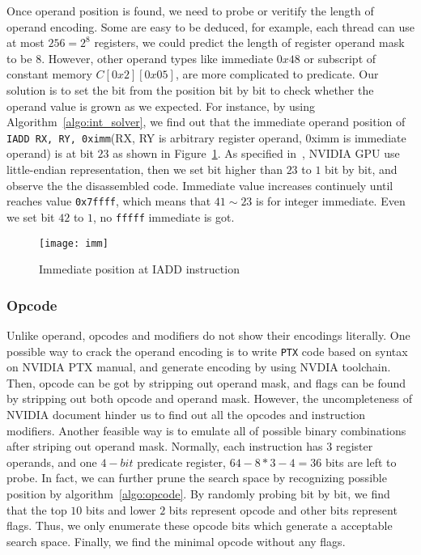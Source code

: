 Once operand position is found, we need to probe or veritify the length of operand encoding. Some are easy to be
deduced, for example, each thread can use at most $256=2^{8}$ registers, we could predict the length of register operand mask to be $8$.
However, other operand types like immediate $0x48$ or subscript of constant memory $C[0x2][0x05]$, are more complicated to predicate. Our solution is to set the bit from the position bit by bit to check whether the operand value is grown as we expected. For instance, by using Algorithm~\ref{algo:int_solver}, we find out that the immediate operand position of {\tt IADD RX, RY, 0ximm}(RX, RY is arbitrary register operand, 0ximm is immediate operand) is at bit $23$ as shown in Figure~\ref{fig:imm}. As specified in~\cite{cuda2015programming}, NVIDIA GPU use little-endian representation, then we set bit higher than $23$ to $1$ bit by bit, and observe the the disassembled code. Immediate value increases continuely until reaches value {\tt 0x7ffff}, which means that $41\sim23$ is for integer immediate. Even we set bit $42$ to $1$, no {\tt fffff} immediate is got. 

\begin{figure}[htbp]
\begin{center}
\texttt{[image: imm]}
    \caption{Immediate position at IADD instruction}
\label{fig:imm}
\end{center}
\end{figure}

\subsubsection{Opcode}
Unlike operand, opcodes and modifiers do not show their encodings literally. One possible way to crack the operand encoding is to write {\tt PTX} code
based on syntax on NVIDIA PTX manual, and generate encoding by using NVDIA toolchain.
Then, opcode can be got by stripping out operand mask, and flags can be found by stripping out both opcode and operand mask. However, the uncompleteness of NVIDIA document hinder us to find out all the opcodes and instruction modifiers. Another feasible way is to emulate all of possible binary combinations after striping out operand mask.
Normally, each instruction has $3$ register operands, and one $4-bit$ predicate register, $64-8*3-4=36$ bits are left to probe.
In fact, we can further prune the search space by recognizing possible position by algorithm~\ref{algo:opcode}. By randomly probing bit by bit, we find that the top $10$ bits and lower $2$ bits represent opcode and other bits represent flags. Thus, we only enumerate these opcode bits which generate a acceptable search space. Finally, we find the minimal opcode without any flags. 


